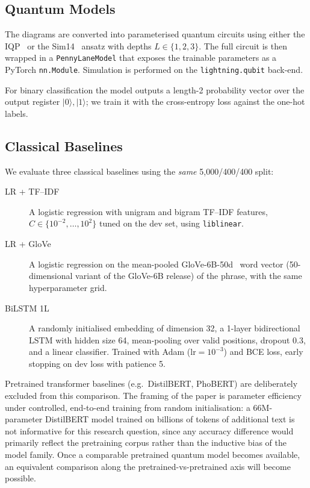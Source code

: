 \documentclass[runningheads]{llncs}
\begin{document}
\subsection{Quantum Models}

The diagrams are converted into parameterised quantum circuits using either
the IQP~\cite{havlicek2019} or the Sim14~\cite{sim2019} ansatz with depths
\(L \in \{1,2,3\}\). The full circuit is then wrapped in a
\texttt{PennyLaneModel} that exposes the trainable parameters as a PyTorch
\texttt{nn.Module}. Simulation is performed on the \texttt{lightning.qubit}
back-end.

For binary classification the model outputs a length-2 probability vector
over the output register \(|0\rangle, |1\rangle\); we train it with the
cross-entropy loss against the one-hot labels.

\subsection{Classical Baselines}

We evaluate three classical baselines using the \emph{same} 5{,}000/400/400
split:

\begin{description}
  \item[LR + TF--IDF] A logistic regression with unigram and bigram TF--IDF
    features, \(C \in \{10^{-2},\ldots,10^{2}\}\) tuned on the dev set,
    using \texttt{liblinear}.
  \item[LR + GloVe] A logistic regression on the mean-pooled
    GloVe-6B-50d~\cite{pennington2014} word vector (50-dimensional variant of the GloVe-6B release) of the phrase, with the
    same hyperparameter grid.
  \item[BiLSTM 1L] A randomly initialised embedding of dimension 32, a
    1-layer bidirectional LSTM with hidden size 64, mean-pooling over
    valid positions, dropout 0.3, and a linear classifier. Trained with
    Adam (\(\text{lr}=10^{-3}\)) and BCE loss, early stopping on dev loss
    with patience 5.
\end{description}

Pretrained transformer baselines (e.g.\ DistilBERT, PhoBERT) are
deliberately excluded from this comparison. The framing of the paper
is parameter efficiency under controlled, end-to-end training from
random initialisation: a 66M-parameter DistilBERT model trained on
billions of tokens of additional text is not informative for this
research question, since any accuracy difference would primarily
reflect the pretraining corpus rather than the inductive bias of the
model family. Once a comparable pretrained quantum model becomes
available, an equivalent comparison along the pretrained-vs-pretrained
axis will become possible.
\end{document}

